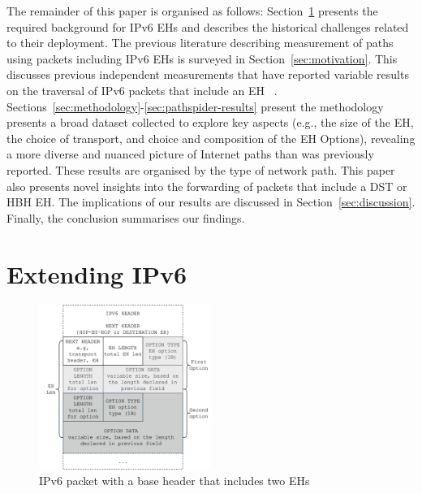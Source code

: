 \documentclass[conference]{IEEEtran}
\begin{document}
The remainder of this paper is organised as follows:  
Section~\ref{sec:background} presents
the required background for IPv6 EHs and describes the historical challenges related to their deployment.  
The previous literature describing measurement of paths using packets including IPv6
EHs is surveyed in Section~\ref{sec:motivation}.
This discusses previous independent measurements that have reported variable results on the traversal of IPv6 packets that include an EH~\cite{RFC7872} \cite{apnic} \cite{nalini-iepg114} \cite{james}.
Sections~\ref{sec:methodology}-\ref{sec:pathspider-results} present the
methodology presents a broad dataset collected to explore key aspects (e.g., the size of the EH, the choice of transport, and choice and composition of the EH Options), revealing a more diverse and nuanced picture of Internet paths than was previously reported. These results are organised by the type of network path. 
This paper also presents novel insights into the forwarding of packets that include a DST or HBH EH. 
The
implications of our results are discussed in Section~\ref{sec:discussion}.
Finally, the conclusion summarises our findings.



\section{Extending IPv6}
\label{sec:background}


\label{sec:ipv6-option-deployment}

\begin{figure}
\centering
  \includegraphics[width=0.5\textwidth]{ehformat.png}
  \caption{IPv6 packet with a base header that includes two EHs}
  \label{fig:eh-format}
\end{figure}
\end{document}
